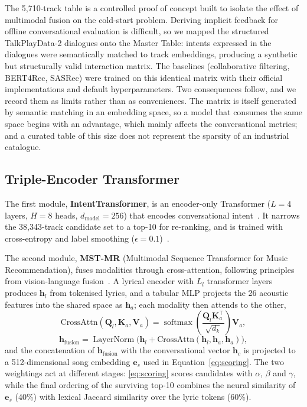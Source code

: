 \documentclass[]{ceurart}
\newcommand{\vect}[1]{\boldsymbol{#1}}
\newcommand{\mat}[1]{\mathbf{#1}}
\newcommand{\softmax}{\operatorname{softmax}}
\newcommand{\LayerNorm}{\operatorname{LayerNorm}}
\begin{document}
The 5,710-track table is a controlled proof of concept built to isolate the
effect of multimodal fusion on the cold-start problem. Deriving implicit
feedback for offline conversational evaluation is difficult, so we mapped the
structured TalkPlayData-2 dialogues onto the Master Table: intents expressed in
the dialogues were semantically matched to track embeddings, producing a
synthetic but structurally valid interaction matrix. The baselines
(collaborative filtering, BERT4Rec, SASRec) were trained on this identical
matrix with their official implementations and default hyperparameters. Two
consequences follow, and we record them as limits rather than as conveniences.
The matrix is itself generated by semantic matching in an embedding space, so a
model that consumes the same space begins with an advantage, which mainly
affects the conversational metrics; and a curated table of this size does not
represent the sparsity of an industrial catalogue.

\subsection{Triple-Encoder Transformer}
The first module, \textbf{IntentTransformer}, is an encoder-only Transformer
($L=4$ layers, $H=8$ heads, $d_{\text{model}}=256$) that encodes conversational
intent~\cite{wolf2020transformers}. It narrows the 38,343-track candidate set to
a top-10 for re-ranking, and is trained with cross-entropy and label smoothing
($\epsilon=0.1$)~\cite{mueller2019label}.

The second module, \textbf{MST-MR} (Multimodal Sequence Transformer for Music
Recommendation), fuses modalities through cross-attention, following
principles from vision-language fusion~\cite{lu2019vilbert,tan2019lxmert}. A
lyrical encoder with $L_l$ transformer layers produces $\vect{h}_l$ from
tokenised lyrics, and a tabular MLP projects the 26 acoustic features into the
shared space as $\vect{h}_a$; each modality then attends to the other,
\begin{equation}
\text{CrossAttn}(\mat{Q}_l, \mat{K}_a, \mat{V}_a)
  = \softmax\left(\frac{\mat{Q}_l \mat{K}_a^\top}{\sqrt{d_k}}\right)\mat{V}_a,
\label{eq:crossattn}
\end{equation}
\begin{equation}
\vect{h}_{\text{fusion}}
  = \LayerNorm\bigl(\vect{h}_l + \text{CrossAttn}(\vect{h}_l, \vect{h}_a,
  \vect{h}_a)\bigr),
\label{eq:fusion}
\end{equation}
and the concatenation of $\vect{h}_{\text{fusion}}$ with the conversational
vector $\vect{h}_c$ is projected to a 512-dimensional song embedding $\vect{e}_s$
used in Equation~\eqref{eq:scoring}. The two weightings act at different stages: \eqref{eq:scoring} scores
candidates with $\alpha$, $\beta$ and $\gamma$, while the final ordering of the
surviving top-10 combines the neural similarity of $\vect{e}_s$ (40\%) with
lexical Jaccard similarity over the lyric tokens (60\%).
\end{document}
